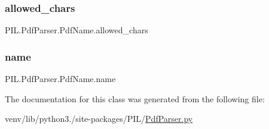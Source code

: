 \subsubsection{\texorpdfstring{allowed\+\_\+chars}{allowed\_chars}}
{\footnotesize\ttfamily P\+I\+L.\+Pdf\+Parser.\+Pdf\+Name.\+allowed\+\_\+chars\hspace{0.3cm}{\ttfamily [static]}}

\mbox{\label{classPIL_1_1PdfParser_1_1PdfName_a817e3ec24c9e61bdc4325aac0b684cfe}} 
\subsubsection{\texorpdfstring{name}{name}}
{\footnotesize\ttfamily P\+I\+L.\+Pdf\+Parser.\+Pdf\+Name.\+name}



The documentation for this class was generated from the following file\+:\begin{DoxyCompactItemize}
\item 
venv/lib/python3./site-\/packages/\+P\+I\+L/\hyperlink{PdfParser_8py}{Pdf\+Parser.\+py}\end{DoxyCompactItemize}
